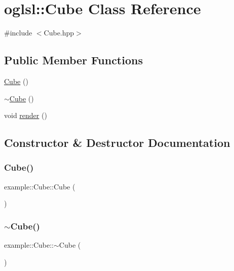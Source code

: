 \hypertarget{classoglsl_1_1_cube}{}\section{oglsl\+:\+:Cube Class Reference}
\label{classoglsl_1_1_cube}


{\ttfamily \#include $<$Cube.\+hpp$>$}

\subsection*{Public Member Functions}
\begin{DoxyCompactItemize}
\item 
\mbox{\hyperlink{classoglsl_1_1_cube_a3be7fbbad6d33b8ca68487fea7e20bdf}{Cube}} ()
\item 
\mbox{\hyperlink{classoglsl_1_1_cube_ab82f621c8aeb1ce7ccd72afd605d6b7a}{$\sim$\+Cube}} ()
\item 
void \mbox{\hyperlink{classoglsl_1_1_cube_a9f968872ab6a7ee0362e49a0c5f4e8b6}{render}} ()
\end{DoxyCompactItemize}


\subsection{Constructor \& Destructor Documentation}
\mbox{\label{classoglsl_1_1_cube_a3be7fbbad6d33b8ca68487fea7e20bdf}} 
\subsubsection{\texorpdfstring{Cube()}{Cube()}}
{\footnotesize\ttfamily example\+::\+Cube\+::\+Cube (\begin{DoxyParamCaption}{ }\end{DoxyParamCaption})}

\mbox{\label{classoglsl_1_1_cube_ab82f621c8aeb1ce7ccd72afd605d6b7a}} 
\subsubsection{\texorpdfstring{$\sim$\+Cube()}{~Cube()}}
{\footnotesize\ttfamily example\+::\+Cube\+::$\sim$\+Cube (\begin{DoxyParamCaption}{ }\end{DoxyParamCaption})}




